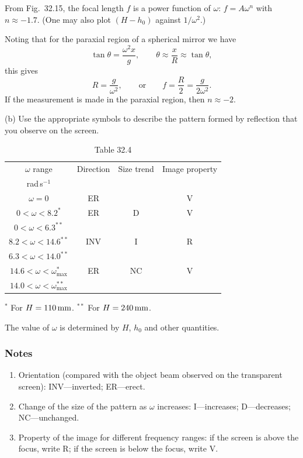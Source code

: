 From Fig.~32.15, the focal length $f$ is a power function of $\omega$: $f=A\omega^n$ with $n\approx-1.7$. (One may also plot $(H-h_0)$ against $1/\omega^2$.)

Noting that for the paraxial region of a spherical mirror we have
\[
\tan\theta=\frac{\omega^2x}{g},\qquad \theta\approx\frac{x}{R}\approx\tan\theta,
\]
this gives
\[
R=\frac{g}{\omega^2},\qquad\text{or}\qquad f=\frac{R}{2}=\frac{g}{2\omega^2}.
\]
If the measurement is made in the paraxial region, then $n\approx-2$.

(b) Use the appropriate symbols to describe the pattern formed by reflection that you observe on the screen.

\begin{table}[h]
\centering
\small
\caption*{Table 32.4}
\begin{tabular}{|c|c|c|c|}
\hline
$\omega$ range & Direction & Size trend & Image property\\
\scriptsize rad\,s$^{-1}$ & & & \\
\hline
$\omega=0$ & ER & & V\\
\hline
$0<\omega<8.2^{*}$ & ER & D & V\\
\hline
$0<\omega<6.3^{**}$ & & & \\
\hline
$8.2<\omega<14.6^{**}$ & INV & I & R\\
\hline
$6.3<\omega<14.0^{**}$ & & & \\
\hline
$14.6<\omega<\omega_{\max}^{*}$ & ER & NC & V\\
\hline
$14.0<\omega<\omega_{\max}^{**}$ & & & \\
\hline
\end{tabular}
\end{table}

\noindent$^{*}$ For $H=110\,\mathrm{mm}$. \quad $^{**}$ For $H=240\,\mathrm{mm}$.

\noindent The value of $\omega$ is determined by $H$, $h_0$ and other quantities.

\subsubsection*{Notes}

\begin{enumerate}
\item[(1)] Orientation (compared with the object beam observed on the transparent screen): INV---inverted; ER---erect.
\item[(2)] Change of the size of the pattern as $\omega$ increases: I---increases; D---decreases; NC---unchanged.
\item[(3)] Property of the image for different frequency ranges: if the screen is above the focus, write R; if the screen is below the focus, write V.
\end{enumerate}

